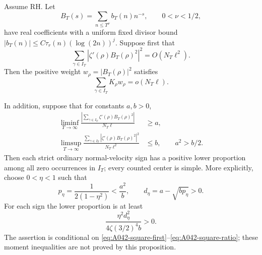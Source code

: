 \begin{proposition}
\label{prop:A042-square-mollifier}
Assume RH.  Let
\[
 B_T(s)=\sum_{n\le T^\nu}b_T(n)n^{-s},
 \qquad 0<\nu<1/2,
\]
have real coefficients with a uniform fixed divisor bound
\(|b_T(n)|\le C\tau_r(n)(\log(2n))^j\).
Suppose first that
\begin{equation}\label{eq:A042-square-second-bound}
 \sum_{\gamma\in I_T}|\zeta'(\rho)B_T(\rho)^2|^2
                                      =O(N_T\ell^2).
\end{equation}
Then the positive weight \(w_\rho=|B_T(\rho)|^2\) satisfies
\begin{equation}\label{eq:A042-square-signed-mean}
                 \sum_{\gamma\in I_T}K_\rho w_\rho
                                      =o(N_T\ell).
\end{equation}

In addition, suppose that for constants \(a,b>0\),
\begin{align}
 \liminf_{T\to\infty}
 \frac{\left|\sum_{\gamma\in I_T}
                     \zeta'(\rho)B_T(\rho)^2\right|}
                                      {N_T\ell}&\ge a,
 \label{eq:A042-square-first}\\
 \limsup_{T\to\infty}
 \frac{\sum_{\gamma\in I_T}
                  |\zeta'(\rho)B_T(\rho)^2|^2}
                                      {N_T\ell^2}&\le b,
 \qquad a^2>b/2 .
 \label{eq:A042-square-ratio}
\end{align}
Then each strict ordinary normal-velocity sign has a positive
lower proportion among all zero occurrences in \(I_T\);
every counted center is simple.  More explicitly, choose
\(0<\eta<1\) such that
\[
 p_\eta=\frac1{2(1-\eta^2)}<\frac{a^2}{b},
 \qquad d_\eta=a-\sqrt{b p_\eta}>0.
\]
For each sign the lower proportion is at least
\begin{equation}\label{eq:A042-square-density}
                   \frac{\eta^2d_\eta^2}
                        {4\zeta(3/2)^4 b}>0.
\end{equation}
The assertion is conditional on
\eqref{eq:A042-square-first}--\eqref{eq:A042-square-ratio};
these moment inequalities are not proved by this proposition.
\end{proposition}

